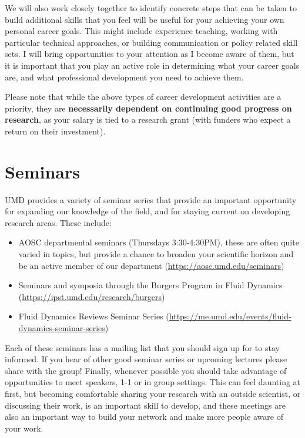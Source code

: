 \documentclass{classassignments}
\begin{document}
We will also work closely together to identify concrete steps that can be taken to build additional skills that you feel will be useful for your achieving your own personal career goals. This might include experience teaching, working with particular technical approaches, or building communication or policy related skill sets. I will bring opportunities to your attention as I become aware of them, but it is important that you play an active role in determining what your career goals are, and what professional development you need to achieve them.  \medskip

 Please note that while the above types of career development activities are a priority, they are \textbf{necessarily dependent on continuing good progress on research}, as your salary is tied to a research grant (with funders who expect a return on their investment). \medskip

\section{Seminars}
UMD provides a variety of seminar series that provide an important opportunity for expanding our knowledge of the field, and for staying current on developing research areas. These include:
\begin{itemize}
\item AOSC departmental seminars	 (Thursdays 3:30-4:30PM), these are often quite varied in topics, but provide a chance to broaden your scientific horizon and be an active member of our department (\url{https://aosc.umd.edu/seminars})
\item Seminars and symposia through the Burgers Program in Fluid Dynamics (\url{https://ipst.umd.edu/research/burgers})
\item Fluid Dynamics Reviews Seminar Series (\url{https://me.umd.edu/events/fluid-dynamics-seminar-series})
\end{itemize}
Each of these seminars has a mailing list that you should sign up for to stay informed. If you hear of other good seminar series or upcoming lectures please share with the group! Finally, whenever possible you should take advantage of opportunities to meet speakers, 1-1 or in group settings. This can feel daunting at first, but becoming comfortable sharing your research with an outside scientist, or discussing their work, is an important skill to develop, and these meetings are also an important way to build your network and make more people aware of your work.
\end{document}
